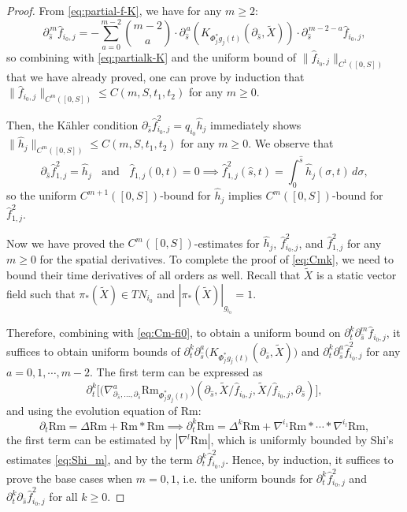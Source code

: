 \documentclass[11pt]{amsart}
\theoremstyle{plain}
\numberwithin{equation}{section}
\theoremstyle{definition}
\theoremstyle{remark}
\begin{document}
\begin{proof}
From \eqref{eq:partial-f-K}, we have for any $m \geq 2$:
\begin{equation}\label{eq:Cm-fi0}
\partial_{\hat s}^{\,m}\hat f_{i_0,j}=-\sum_{a=0}^{m-2}\binom{m-2}{a} \cdot \partial_{\hat s}^{\,a}(K_{\Phi_j^*g_j(t)}(\partial_{\hat s},\widetilde{X}))\cdot \partial_{\hat s}^{\,m-2-a}\hat f_{i_0,j},
\end{equation}
so combining with \eqref{eq:partialk-K} and the uniform bound of $\|\hat{f}_{i_0,j}\|_{C^1([0,S])}$ that we have already proved, one can prove by induction that $\|\hat{f}_{i_0,j}\|_{C^m([0,S])} \leq C(m,S,t_1,t_2)$ for any $m \geq 0$.

Then, the K\"ahler condition $\partial_{\hat{s}}\hat{f}_{i_0,j}^2 = q_{i_0}\hat{h}_j$ immediately shows $\|\hat{h}_j\|_{C^m([0,S])} \leq C(m,S,t_1,t_2)$ for any $m \geq 0$.  We observe that
\[\partial_{\hat{s}}\hat{f}_{1,j}^2 = \hat{h}_j \;\;\text{ and }\;\; \hat{f}_{1,j}(0,t) = 0 \implies \hat{f}_{1,j}^2(\hat{s},t) = \int_0^{\hat{s}}\hat{h}_j(\sigma,t)\,d\sigma,\]
so the uniform $C^{m+1}([0,S])$-bound for $\hat{h}_j$ implies $C^m([0,S])$-bound for $\hat{f}_{1,j}^2$.

Now we have proved the $C^m([0,S])$-estimates for $\hat{h}_j$, $\hat{f}_{i_0,j}^2$, and $\hat{f}_{1,j}^2$ for any $m \geq 0$ for the spatial derivatives. To complete the proof of \eqref{eq:Cmk}, we need to bound their time derivatives of all orders as well. Recall that $\widetilde{X}$ is a static vector field such that $\pi_*(\widetilde{X}) \in TN_{i_0}$ and $|\pi_*(\widetilde{X})|_{g_{i_0}} = 1$.



Therefore, combining with \eqref{eq:Cm-fi0}, to obtain a uniform bound on $\partial_t^k \partial_{\hat{s}}^m \hat{f}_{i_0,j}$, it suffices to obtain uniform bounds of $\partial_t^k \partial_{\hat{s}}^a\big(K_{\Phi_j^*g_j(t)}(\partial_{\hat s},\widetilde{X})\big)$ and $\partial_t^k\partial_{\hat{s}}^a \hat f_{i_0,j}^2$ for any $a = 0, 1, \cdots, m-2$. The first term can be expressed as 
\[\partial_t^k\Big[\big(\nabla^a_{\partial_{\hat s},\dots,\partial_{\hat s}}\mathrm{Rm}_{\Phi_j^*g_j(t)}\big)(\partial_{\hat s},\tilde X/\hat f_{i_0,j},\tilde X/\hat f_{i_0,j},\partial_{\hat s})\Big],\]
and using the evolution equation of $\textrm{Rm}$:
\begin{equation}
\label{eq:Box_Rm}
\partial_t \textrm{Rm} = \Delta\textrm{Rm} + \textrm{Rm} * \textrm{Rm} \implies \partial_t^k \textrm{Rm} = \Delta^k \textrm{Rm} + \nabla^{i_1}\textrm{Rm} * \cdots * \nabla^{i_l}\textrm{Rm},
\end{equation}
the first term can be estimated by $|\nabla^l\textrm{Rm}|$, which is uniformly bounded by Shi's estimates \eqref{eq:Shi_m}, and by the term $\partial_t^k \hat{f}_{i_0,j}^2$. Hence, by induction, it suffices to prove the base cases when $m = 0, 1$, i.e. the uniform bounds for $\partial_t^k \hat{f}_{i_0,j}^2$ and $\partial_t^k \partial_{\hat{s}}\hat{f}_{i_0,j}^2$ for all $k \geq 0$.


\end{proof}
\end{document}
